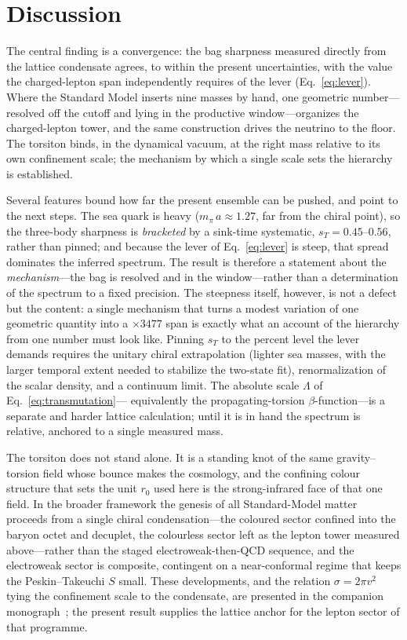 \documentclass[aps,prd,reprint,nofootinbib,superscriptaddress]{revtex4-2}
\newcommand{\sT}{s_{T}}
\begin{document}
\section{Discussion}
\label{sec:discuss}

The central finding is a convergence: the bag sharpness measured directly from the lattice condensate
agrees, to within the present uncertainties, with the value the charged-lepton span independently
requires of the lever (Eq.~\ref{eq:lever}). Where the Standard Model inserts nine masses by hand, one
geometric number---resolved off the cutoff and lying in the productive window---organizes the
charged-lepton tower, and the same construction drives the neutrino to the floor. The torsiton binds,
in the dynamical vacuum, at the right mass relative to its own confinement scale; the mechanism by which
a single scale sets the hierarchy is established.

Several features bound how far the present ensemble can be pushed, and point to the next steps. The
sea quark is heavy ($m_\pi\,a \approx 1.27$, far from the chiral point), so the three-body sharpness is
\emph{bracketed} by a sink-time systematic, $\sT = 0.45$--$0.56$, rather than pinned; and because the
lever of Eq.~\eqref{eq:lever} is steep, that spread dominates the inferred spectrum. The result is
therefore a statement about the \emph{mechanism}---the bag is resolved and in the window---rather than a
determination of the spectrum to a fixed precision. The steepness itself, however, is not a defect but
the content: a single mechanism that turns a modest variation of one geometric quantity into a
$\times 3477$ span is exactly what an account of the hierarchy from one number must look like. Pinning
$\sT$ to the percent level the lever demands requires the unitary chiral extrapolation (lighter sea
masses, with the larger temporal extent needed to stabilize the two-state fit), renormalization of the
scalar density, and a continuum limit. The absolute scale $\Lambda$ of Eq.~\eqref{eq:transmutation}---
equivalently the propagating-torsion $\beta$-function---is a separate and harder lattice calculation;
until it is in hand the spectrum is relative, anchored to a single measured mass.

The torsiton does not stand alone. It is a standing knot of the same gravity--torsion field whose
bounce makes the cosmology, and the confining colour structure that sets the unit $r_0$ used here is
the strong-infrared face of that one field. In the broader framework the genesis of all Standard-Model
matter proceeds from a single chiral condensation---the coloured sector confined into the baryon
octet and decuplet, the colourless sector left as the lepton tower measured above---rather than the
staged electroweak-then-QCD sequence, and the electroweak sector is composite, contingent on a
near-conformal regime that keeps the Peskin--Takeuchi $S$ small. These developments, and the relation
$\sigma = 2\pi v^2$ tying the confinement scale to the condensate, are presented in the companion
monograph~\citep{eternaldawn}; the present result supplies the lattice anchor for the lepton sector of
that programme.
\end{document}
